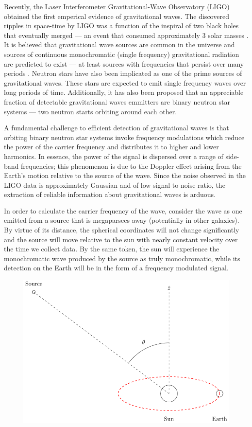 \documentclass[onecolumn, groupedaddress, 10pt]{revtex4-1}
\begin{document}
Recently, the Laser Interferometer Gravitational-Wave Observatory (LIGO) obtained the first emperical evidence of gravitational waves. The discovered ripples in space-time by LIGO was a function of the inspiral of two black holes that eventually merged --- an event that consumed approximately 3 solar masses \citep{abbott}.  It is believed that gravitational wave sources are common in the universe and sources of continuous monochromatic (single frequency) gravitational radiation are predicted to exist --- at least sources with frequencies that persist over many periods \cite{}. Neutron stars have also been implicated as one of the prime sources of gravitational waves.  These stars are expected to emit single frequency waves over long periods of time.  Additionally, it has also been proposed that an appreciable fraction of detectable gravitational waves emmitters are binary neutron star systems --- two neutron starts orbiting around each other.

A fundamental challenge to efficient detection of gravitational waves is that orbiting binary neutron star systems invoke frequency modulations which reduce the power of the carrier frequency and distributes it to higher and lower harmonics.  In essence, the power of the signal is dispersed over a range of side-band frequencies; this phenomenon is due to the Doppler effect arising from the Earth's motion relative to the source of the wave. Since the noise observed in the LIGO data is approximately Gaussian and of low signal-to-noise ratio, the extraction of reliable information about gravitational waves is arduous.

In order to calculate the carrier frequency of the wave, consider the wave as one emitted from a source that is megaparsecs away (potentially in other galaxies). By virtue of its distance, the spherical coordinates will not change significantly and the source will move relative to the sun with nearly constant velocity over the time we collect data. By the same token, the sun will experience the monochromatic wave produced by the source as truly monochromatic, while its detection on the Earth will be in the form of a frequency modulated signal.

\begin{figure}[ht]
	\centering
	\includegraphics[width=.75\linewidth]{earthMotionModulationFigure.pdf}
	\caption{\label{fig:earthMotionModulationFigure}}
\end{figure}
\end{document}
